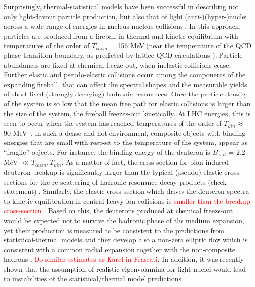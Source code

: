 \documentclass[a4paper,11pt]{scrartcl} %
\begin{document}
Surprisingly, thermal-statistical models have been successful in describing not only light-flavour particle production, but also that of light (anti-)(hyper-)nuclei across a wide range of energies in nucleus-nucleus collisions \cite{Andronic:2017, Andronic:2010qu}. 
In this approach, particles are produced from a fireball in thermal and kinetic equilibrium with temperatures of the order of $T_{chem}$ = 156 MeV (near the temperature of the QCD phase transition boundary, as predicted by lattice QCD calculations \cite{Bazavov:2014pvz}). Particle abundances are fixed at chemical freeze-out, when inelastic collisions cease. Further elastic and pseudo-elastic collisions occur among the components of the expanding fireball, that can affect the spectral shapes and the measurable yields of short-lived (strongly decaying) hadronic resonances. Once the particle density of the system is so low that the mean free path for elastic collisions is larger than the size of the system, the fireball freezes-out kinetically. At LHC energies, this is seen to occur when the system has reached temperatures of the order of $T_{kin} \approx$ 90 MeV~\cite{Abelev:2013vea}. 
In such a dense and hot environment, composite objects with binding energies that are small with respect to the temperature of the system, appear as ``fragile'' objects. For instance, the binding energy of the deuteron is $B_{E, d}$ = 2.2 MeV $\ll T_{chem}, T_{kin}$.
As a matter of fact, the cross-section for pion-induced deuteron breakup is significantly larger than the typical (pseudo)-elastic cross-sections for the re-scattering of hadronic resonance decay products (check statement) \cite{Garcilazo:1982yc, Bass:1998ca, Schukraft:2017nbn}. 
Similarly, the elastic cross-section which drives the deuteron spectra to kinetic equilibration in central heavy-ion collisions \cite{Acharya:2017dmc} is \textcolor{red}{smaller than the breakup cross-section} \cite{Schukraft:2017nbn}.   
Based on this, the deuterons produced at chemical freeze-out would be expected not to survive the hadronic phase of the medium expansion, yet their production is measured to be consistent to the predictions from statistical-thermal models and they develop also a non-zero elliptic flow which is consistent with a common radial expansion together with the non-composite hadrons \cite{Acharya:2017dmc}. 
\textcolor{red}{Do similar estimates as Karel in Frascati}. In addition, it was recently shown that the assumption of realistic eigenvolumina for light nuclei would lead to instabilities of the statistical/thermal model predictions \cite{Vovchenko:2016mwg}.
\end{document}
